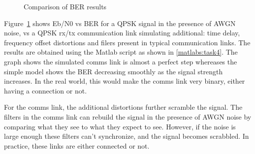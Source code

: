 \begin{figure}[ht!]
    \begin{center}
        
        \caption{Comparison of BER results }
    \end{center}\label{fig:4}
\end{figure}

Figure~\ref{fig:4} shows Eb/N0 vs BER for a QPSK signal in the presence of AWGN noise, vs a QPSK rx/tx communication link simulating additional: time delay, frequency offset distortions and filers present in typical communication links. The results are obtained using the Matlab script as shown in \ref{matlabs:task4}. The graph shows the simulated comms link is almost a perfect step whereases the simple model shows the BER decreasing smoothly as the signal strength increases. In the real world, this would make the comms link very binary, either having a connection or not. 

For the comms link, the additional distortions further scramble the signal. The filters in the comms link can rebuild the signal in the presence of AWGN noise by comparing what they see to what they expect to see. However, if the noise is large enough these filters can't synchronize, and the signal becomes scrabbled. In practice, these links are either connected or not.